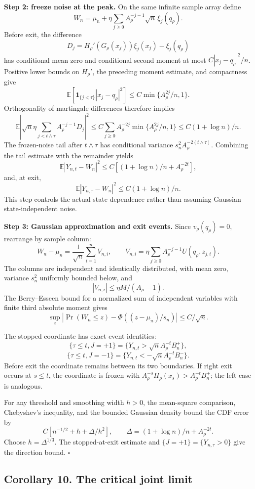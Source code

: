 \textbf{Step 2: freeze noise at the peak.} On the same infinite sample
array define \[
W_n=\mu_n+\eta\sum_{j\ge0}A_\rho^{-j-1}\sqrt n\,\xi_j(q_\rho).
\] Before exit, the difference \[
D_j=H_\rho'(G_\rho(x_j))\xi_j(x_j)-\xi_j(q_\rho)
\] has conditional mean zero and conditional second moment at most
\(C|x_j-q_\rho|^2/n\). Positive lower bounds on \(H_\rho'\), the
preceding moment estimate, and compactness give \[
\mathbb E[\mathbf1_{\{j<\tau\}}|x_j-q_\rho|^2]
\le C\min\{A_\rho^{2j}/n,1\}.
\] Orthogonality of martingale differences therefore implies \[
\mathbb E\left|
\sqrt n\eta\sum_{j<t\wedge\tau}A_\rho^{-j-1}D_j
\right|^2
\le C\sum_{j\ge0}A_\rho^{-2j}\min\{A_\rho^{2j}/n,1\}
\le C(1+\log n)/n.
\] The frozen-noise tail after \(t\wedge\tau\) has conditional variance
\(s_n^2A_\rho^{-2(t\wedge\tau)}\). Combining the tail estimate with the
remainder yields \[
\mathbb E|Y_{n,t}-W_n|^2
\le C[(1+\log n)/n+A_\rho^{-2t}],
\] and, at exit, \[
\mathbb E|Y_{n,\tau}-W_n|^2\le C(1+\log n)/n.
\] This step controls the actual state dependence rather than assuming
Gaussian state-independent noise.

\textbf{Step 3: Gaussian approximation and exit events.} Since
\(v_\rho(q_\rho)=0\), rearrange by sample column: \[
W_n-\mu_n=\frac1{\sqrt n}\sum_{i=1}^nV_{n,i},\qquad
V_{n,i}=\eta\sum_{j\ge0}A_\rho^{-j-1}U(q_\rho,z_{j,i}).
\] The columns are independent and identically distributed, with mean
zero, variance \(s_n^2\) uniformly bounded below, and \[
|V_{n,i}|\le\eta M/(A_\rho-1).
\] The Berry--Esseen bound for a normalized sum of independent variables
with finite third absolute moment gives \[
\sup_z|\Pr(W_n\le z)-\Phi((z-\mu_n)/s_n)|\le C/\sqrt n.
\]

The stopped coordinate has exact event identities: \[
\{\tau\le t,J=+1\}=
\{Y_{n,t}>\sqrt n A_\rho^{-t}B_n^+\},
\] \[
\{\tau\le t,J=-1\}=
\{Y_{n,t}<-\sqrt n A_\rho^{-t}B_n^-\}.
\] Before exit the coordinate remains between its two boundaries. If
right exit occurs at \(s\le t\), the coordinate is frozen with
\(A_\rho^{-s}H_\rho(x_s)>A_\rho^{-t}B_n^+\); the left case is analogous.

For any threshold and smoothing width \(h>0\), the mean-square
comparison, Chebyshev's inequality, and the bounded Gaussian density
bound the CDF error by \[
C[n^{-1/2}+h+\Delta/h^2],\qquad
\Delta=(1+\log n)/n+A_\rho^{-2t}.
\] Choose \(h=\Delta^{1/3}\). The stopped-at-exit estimate and
\(\{J=+1\}=\{Y_{n,\tau}>0\}\) give the direction bound. \(\square\)

\subsection{Corollary 10. The critical joint
limit}\label{gaussian_proofs-corollary-10.-the-critical-joint-limit}

